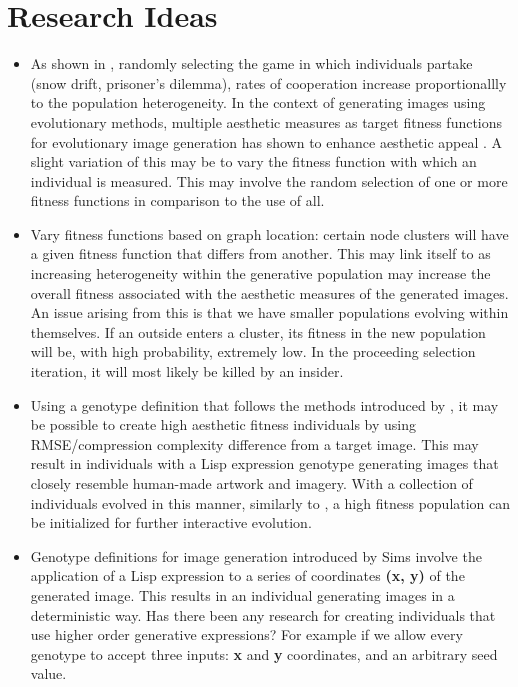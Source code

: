 \documentclass[10pt,a4paper]{article}
\begin{document}
	\section{Research Ideas}
	\begin{itemize}
		
		\item As shown in \citep{mixed-games}, randomly selecting the game in which individuals partake (snow drift, prisoner's dilemma), rates of cooperation increase proportionallly to the population heterogeneity.
		In the context of generating images using evolutionary methods, multiple aesthetic measures as target fitness functions for evolutionary image generation has shown to enhance aesthetic appeal \citep{aesthetic-measures}.
		A slight variation of this may be to vary the fitness function with which an individual is measured.
		This may involve the random selection of one or more fitness functions in comparison to the use of all.
		
		\item Vary fitness functions based on graph location: certain node clusters will have a given fitness function that differs from another.
		This may link itself to \citep{mixed-games} as increasing heterogeneity within the generative population may increase the overall fitness associated with the aesthetic measures of the generated images.
		An issue arising from this is that we have smaller populations evolving within themselves.
		If an outside enters a cluster, its fitness in the new population will be, with high probability, extremely low.
		In the proceeding selection iteration, it will most likely be killed by an insider.
		
		\item Using a genotype definition that follows the methods introduced by \citep{sims}, it may be possible to create high aesthetic fitness individuals by using RMSE/compression complexity difference from a target image. 
		This may result in individuals with a Lisp expression genotype generating images that closely resemble human-made artwork and imagery.
		With a collection of individuals evolved in this manner, similarly to \citep{nevar}, a high fitness population can be initialized for further interactive evolution.
		
		\item Genotype definitions for image generation introduced by Sims \citep{sims} involve the application of a Lisp expression to a series of coordinates \textbf{(x, y)} of the generated image.
		This results in an individual generating images in a deterministic way.
		Has there been any research for creating individuals that use higher order generative expressions?
		For example if we allow every genotype to accept three inputs: \textbf{x} and \textbf{y} coordinates, and an arbitrary seed value.
		

\end{itemize}
\end{document}
